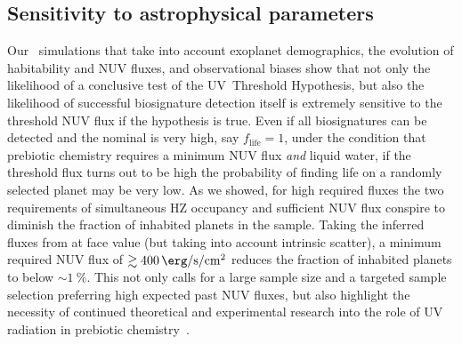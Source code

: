 \documentclass[twocolumn,twocolappendix,linenumbers]{aastex631}
\begin{document}
\subsection{Sensitivity to astrophysical parameters} %
Our \bioverse\ simulations that take into account exoplanet demographics, the evolution of habitability and \gls{NUV} fluxes, and observational biases show that not only the likelihood of a conclusive test of the UV~Threshold Hypothesis, but also the likelihood of successful biosignature detection itself is extremely sensitive to the threshold \gls{NUV} flux if the hypothesis is true.
Even if all biosignatures can be detected and the nominal  is very high, say $f_\mathrm{life} = 1$, under the condition that prebiotic chemistry requires a minimum \gls{NUV} flux \textit{and} liquid water, if the threshold flux turns out to be high the probability of finding life on a randomly selected planet may be very low.
As we showed, for high required fluxes the two requirements of simultaneous \gls{HZ} occupancy and sufficient \gls{NUV} flux conspire to diminish the fraction of inhabited planets in the sample.
Taking the inferred fluxes from \citet{Richey-Yowell2023} at face value (but taking into account intrinsic scatter), a minimum required \gls{NUV} flux of $\gtrsim\SI{400}{\erg\per\second\per\centi\meter\squared}$ reduces the fraction of inhabited planets to below $\sim\SI{1}{\percent}$.
This not only calls for a large sample size and a targeted sample selection preferring high expected past \gls{NUV} fluxes, but also highlight the necessity of continued theoretical and experimental research into the role of \gls{UV} radiation in prebiotic chemistry~\citep{Ranjan2017b,Rimmer2018,Rimmer2021}.




\end{document}
